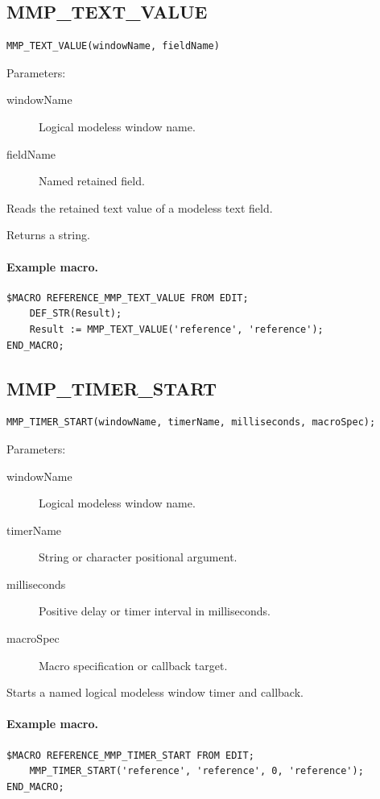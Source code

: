 \documentclass[a4paper,10pt,twoside,openany]{book}
\newenvironment{mrmacextension}{\begin{changebar}}{\end{changebar}}
\begin{document}
\begin{mrmacextension}
\label{prim:intrinsic-mmp-text-value}
\subsection*{MMP\_TEXT\_VALUE}
\begin{verbatim}
MMP_TEXT_VALUE(windowName, fieldName)
\end{verbatim}
Parameters:
\begin{description}
\item[windowName] Logical modeless window name.
\item[fieldName] Named retained field.
\end{description}

Reads the retained text value of a modeless text field.

Returns a string.

\paragraph{Example macro.}
\begin{verbatim}
$MACRO REFERENCE_MMP_TEXT_VALUE FROM EDIT;
    DEF_STR(Result);
    Result := MMP_TEXT_VALUE('reference', 'reference');
END_MACRO;
\end{verbatim}
\end{mrmacextension}

\begin{mrmacextension}
\label{prim:procedure-mmp-timer-start}
\subsection*{MMP\_TIMER\_START}
\begin{verbatim}
MMP_TIMER_START(windowName, timerName, milliseconds, macroSpec);
\end{verbatim}
Parameters:
\begin{description}
\item[windowName] Logical modeless window name.
\item[timerName] String or character positional argument.
\item[milliseconds] Positive delay or timer interval in milliseconds.
\item[macroSpec] Macro specification or callback target.
\end{description}

Starts a named logical modeless window timer and callback.

\paragraph{Example macro.}
\begin{verbatim}
$MACRO REFERENCE_MMP_TIMER_START FROM EDIT;
    MMP_TIMER_START('reference', 'reference', 0, 'reference');
END_MACRO;
\end{verbatim}
\end{mrmacextension}
\end{document}
